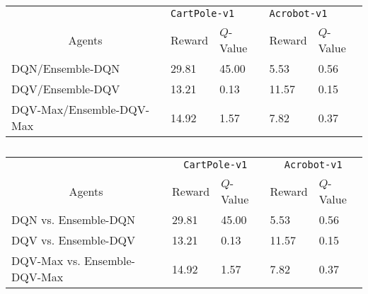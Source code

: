 \documentclass{article}
\begin{document}
\begin{table}[]
\begin{tabular}{@{}|l|ll|ll|@{}}
\toprule
\multicolumn{1}{|c|}{}                         & \multicolumn{2}{l|}{\texttt{CartPole-v1}}                   & \multicolumn{2}{l|}{\texttt{Acrobot-v1}}                                          \\ \cmidrule(l){2-5}
\multicolumn{1}{|c|}{\multirow{-2}{*}{Agents}} & \multicolumn{1}{l|}{Reward} & $Q$-Value                     & \multicolumn{1}{l|}{Reward}                        & $Q$-Value                    \\ \midrule
DQN/Ensemble-DQN                               & \multicolumn{1}{l|}{29.81}  & \cellcolor[HTML]{FFFC9E}45.00 & \multicolumn{1}{l|}{\cellcolor[HTML]{FFFC9E}5.53}  & \cellcolor[HTML]{FFFC9E}0.56 \\ \midrule
DQV/Ensemble-DQV                               & \multicolumn{1}{l|}{13.21}  & 0.13                          & \multicolumn{1}{l|}{\cellcolor[HTML]{FFFC9E}11.57} & \cellcolor[HTML]{FFFC9E}0.15 \\ \midrule
DQV-Max/Ensemble-DQV-Max                       & \multicolumn{1}{l|}{14.92}  & 1.57                          & \multicolumn{1}{l|}{\cellcolor[HTML]{FFFC9E}7.82}  & \cellcolor[HTML]{FFFC9E}0.37 \\ \bottomrule
\end{tabular}
\caption{}
\label{tab:my-table-2}
\end{table}

\begin{table}[]
\begin{tabular}{@{}|l|ll|ll|@{}}
\toprule
\multicolumn{1}{|c|}{}                         & \multicolumn{2}{c|}{\texttt{CartPole-v1}}                   & \multicolumn{2}{c|}{\texttt{Acrobot-v1}}                                          \\ \cmidrule(l){2-5}
\multicolumn{1}{|c|}{\multirow{-2}{*}{Agents}} & \multicolumn{1}{l|}{Reward} & $Q$-Value                     & \multicolumn{1}{l|}{Reward}                        & $Q$-Value                    \\ \midrule
DQN vs. Ensemble-DQN                           & \multicolumn{1}{l|}{29.81}  & \cellcolor[HTML]{FFFC9E}45.00 & \multicolumn{1}{l|}{\cellcolor[HTML]{FFFC9E}5.53}  & \cellcolor[HTML]{FFFC9E}0.56 \\ \midrule
DQV vs. Ensemble-DQV                           & \multicolumn{1}{l|}{13.21}  & 0.13                          & \multicolumn{1}{l|}{\cellcolor[HTML]{FFFC9E}11.57} & \cellcolor[HTML]{FFFC9E}0.15 \\ \midrule
DQV-Max vs. Ensemble-DQV-Max                   & \multicolumn{1}{l|}{14.92}  & 1.57                          & \multicolumn{1}{l|}{\cellcolor[HTML]{FFFC9E}7.82}  & \cellcolor[HTML]{FFFC9E}0.37 \\ \bottomrule
\end{tabular}
\caption{}
\label{tab:my-table-3}
\end{table}
\end{document}
